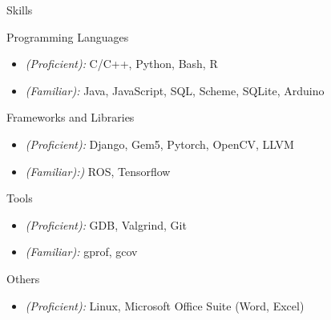 \documentclass[]{mcdowellcv}
\begin{document}
\vspace*{-10pt}
\begin{cvsection}{Skills}
  \begin{cvsubsection}{Programming Languages}{}{}	
    \begin{itemize}
      \item \emph{(Proficient):} C/C++, Python, Bash, R  
      \item \emph{(Familiar):} Java, JavaScript, SQL, Scheme, SQLite, Arduino
    \end{itemize}
  \end{cvsubsection}
  
  \begin{cvsubsection}{Frameworks and Libraries}{}{}
    \begin{itemize}
      \item \emph{(Proficient):} Django, Gem5, Pytorch, OpenCV, LLVM
      \item \emph{(Familiar):)} ROS, Tensorflow
    \end{itemize}
  \end{cvsubsection}
  
  \begin{cvsubsection}{Tools}{}{}
    \begin{itemize}
      \item \emph{(Proficient):} GDB, Valgrind, Git 
      \item \emph{(Familiar):} gprof, gcov
    \end{itemize}
  \end{cvsubsection}

  \begin{cvsubsection}{Others}{}{}
    \begin{itemize}
    \item \emph{(Proficient):} Linux, Microsoft Office Suite (Word, Excel)
    \end{itemize}
  \end{cvsubsection}

\end{cvsection}
\end{document}
